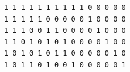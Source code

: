 \begin{verbatim}
1 1 1 1 1 1 1 1 1 1 0 0 0 0 0 
1 1 1 1 1 0 0 0 0 0 1 0 0 0 0 
1 1 1 0 0 1 1 0 0 0 0 1 0 0 0 
1 1 0 1 0 1 0 1 0 0 0 0 1 0 0 
1 0 1 0 1 0 1 1 0 0 0 0 0 1 0 
1 0 1 1 0 1 0 0 1 0 0 0 0 0 1 
\end{verbatim}
